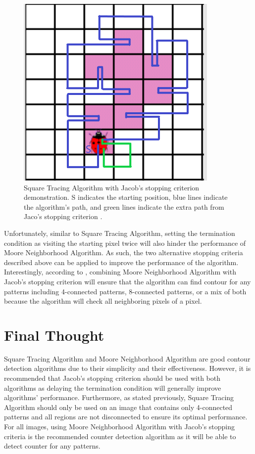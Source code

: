 \documentclass[conference]{IEEEtran}
\begin{document}
\begin{figure}[!htb]
    \centering
    \includegraphics[scale = 0.5]{fig5.png}
    \caption{Square Tracing Algorithm with Jacob's stopping criterion demonstration. S indicates the starting position, blue lines indicate the algorithm's path, and green lines indicate the extra path from Jaco's stopping criterion \cite{mnt:2000}.}
\end{figure}

Unfortunately, similar to Square Tracing Algorithm, setting the termination condition as visiting the starting pixel twice will also hinder the performance of Moore Neighborhood Algorithm. As such, the two alternative stopping criteria described above can be applied to improve the performance of the algorithm. Interestingly, according to \cite{mnt:2000}, combining Moore Neighborhood Algorithm with Jacob's stopping criterion will ensure that the algorithm can find contour for any patterns including 4-connected patterns, 8-connected patterns, or a mix of both because the algorithm will check all neighboring pixels of a pixel.

\section{Final Thought}
Square Tracing Algorithm and Moore Neighborhood Algorithm are good contour detection algorithms due to their simplicity and their effectiveness. However, it is recommended that Jacob's stopping criterion should be used with both algorithms as delaying the termination condition will generally improve algorithms' performance. Furthermore, as stated previously, Square Tracing Algorithm should only be used on an image that contains only 4-connected patterns and all regions are not disconnected to ensure its optimal performance. For all images, using Moore Neighborhood Algorithm with Jacob's stopping criteria is the recommended counter detection algorithm as it will be able to detect counter for any patterns.

\printbibliography
\end{document}
